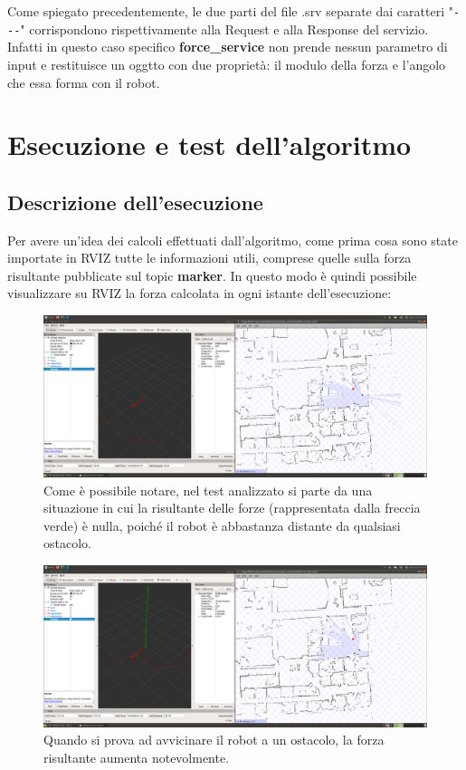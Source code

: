 \documentclass[Lau, binding=0.6cm, oneside]{sapthesis}
\begin{document}
Come spiegato precedentemente, le due parti del file .srv separate dai caratteri "\lstinline{---}" corrispondono rispettivamente alla Request e alla Response del servizio.
Infatti in questo caso specifico \textbf{force\_service} non prende nessun parametro di input e restituisce un oggtto con due proprietà: il modulo della forza e l'angolo che essa forma con il robot.

\chapter{Esecuzione e test dell'algoritmo}
\section{Descrizione dell'esecuzione}
Per avere un'idea dei calcoli effettuati dall'algoritmo, come prima cosa sono state importate in RVIZ tutte le informazioni utili, comprese quelle sulla forza risultante pubblicate sul topic \textbf{marker}.
In questo modo è quindi possibile visualizzare su RVIZ la forza calcolata in ogni istante dell'esecuzione:
\begin{figure}[htp]
    \centering
    \includegraphics[width=13.5cm]{rviz_force1.png}
    \caption{Come è possibile notare, nel test analizzato si parte da una situazione in cui la risultante delle forze (rappresentata dalla freccia verde) è nulla, poiché il robot è abbastanza distante da qualsiasi ostacolo.}
    \label{fig:rviz_force1}
\end{figure}
\begin{figure}[htp]
    \centering
    \includegraphics[width=13.5cm]{rviz_force2.png}
    \caption{Quando si prova ad avvicinare il robot a un ostacolo, la forza risultante aumenta notevolmente.}
    \label{fig:rviz_force2}
\end{figure}
\end{document}

